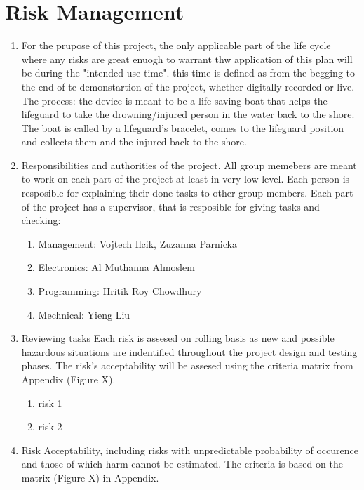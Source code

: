 \documentclass{article}[10pt]
\begin{document}
\section{Risk Management}
\begin{enumerate}
    \item For the prupose of this project, the only applicable part of the life cycle where any risks are great enuogh to warrant thw application 
    of this plan will be during the "intended use time". this time is defined as from the begging to the end of te demonstartion of the project, 
    whether digitally recorded or live. \\
    The process: the device is meant to be a life saving boat that helps the lifeguard to take the drowning/injured person in the water back to the shore.
    The boat is called by a lifeguard's bracelet, comes to the lifeguard position and collects them and the injured back to the shore. 
    \item Responsibilities and authorities of the project.
    All group memebers are meant to work on each part of the project at least in very low level. Each person is resposible for explaining
    their done tasks to other group members. Each part of the project has a supervisor, that is resposible for giving tasks and checking:
    \begin{enumerate}
        \item Management: Vojtech Ilcik, Zuzanna Parnicka
        \item Electronics: Al Muthanna Almoslem
        \item Programming: Hritik Roy Chowdhury
        \item Mechnical: Yieng Liu
    \end{enumerate}
    \item Reviewing tasks
    Each risk is assesed on rolling basis as new and possible hazardous situations are indentified throughout the project design and testing phases.
    The risk's acceptability will be assesed using the criteria matrix from Appendix (Figure X).
    \begin{enumerate}
        \item risk 1
        \item risk 2
    \end{enumerate}
    \item Risk Acceptability, including risks with unpredictable probability of occurence and those of which harm cannot be estimated.
    The criteria is based on the matrix (Figure X) in Appendix.
    \begin{enumerate}

\end{enumerate}
\end{enumerate}
\end{document}
